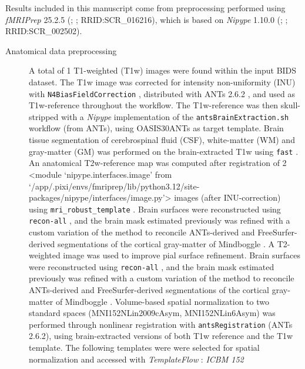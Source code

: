 \documentclass[
]{article}
\author{}
\date{}
\begin{document}
Results included in this manuscript come from preprocessing performed
using \emph{fMRIPrep} 25.2.5 (\citet{fmriprep1}; \citet{fmriprep2};
RRID:SCR\_016216), which is based on \emph{Nipype} 1.10.0
(\citet{nipype1}; \citet{nipype2}; RRID:SCR\_002502).

\begin{description}
\item[Anatomical data preprocessing]
A total of 1 T1-weighted (T1w) images were found within the input BIDS
dataset. The T1w image was corrected for intensity non-uniformity (INU)
with \texttt{N4BiasFieldCorrection} \citep{n4}, distributed with ANTs
2.6.2 \citep[RRID:SCR\_004757]{ants}, and used as T1w-reference
throughout the workflow. The T1w-reference was then skull-stripped with
a \emph{Nipype} implementation of the \texttt{antsBrainExtraction.sh}
workflow (from ANTs), using OASIS30ANTs as target template. Brain tissue
segmentation of cerebrospinal fluid (CSF), white-matter (WM) and
gray-matter (GM) was performed on the brain-extracted T1w using
\texttt{fast} \citep[FSL (version unknown),
RRID:SCR\_002823,][]{fsl_fast}. An anatomical T2w-reference map was
computed after registration of 2 \textless module
`nipype.interfaces.image' from
`/app/.pixi/envs/fmriprep/lib/python3.12/site-packages/nipype/interfaces/image.py'\textgreater{}
images (after INU-correction) using \texttt{mri\_robust\_template}
\citep[FreeSurfer 7.3.2,][]{fs_template}. Brain surfaces were
reconstructed using \texttt{recon-all} \citep[FreeSurfer 7.3.2,
RRID:SCR\_001847,][]{fs_reconall}, and the brain mask estimated
previously was refined with a custom variation of the method to
reconcile ANTs-derived and FreeSurfer-derived segmentations of the
cortical gray-matter of Mindboggle
\citep[RRID:SCR\_002438,][]{mindboggle}. A T2-weighted image was used to
improve pial surface refinement. Brain surfaces were reconstructed using
\texttt{recon-all} \citep[FreeSurfer 7.3.2,
RRID:SCR\_001847,][]{fs_reconall}, and the brain mask estimated
previously was refined with a custom variation of the method to
reconcile ANTs-derived and FreeSurfer-derived segmentations of the
cortical gray-matter of Mindboggle
\citep[RRID:SCR\_002438,][]{mindboggle}. Volume-based spatial
normalization to two standard spaces (MNI152NLin2009cAsym,
MNI152NLin6Asym) was performed through nonlinear registration with
\texttt{antsRegistration} (ANTs 2.6.2), using brain-extracted versions
of both T1w reference and the T1w template. The following templates were
were selected for spatial normalization and accessed with
\emph{TemplateFlow} \citep[25.0.4,][]{templateflow}: \emph{ICBM 152
}
\end{description}
\end{document}
